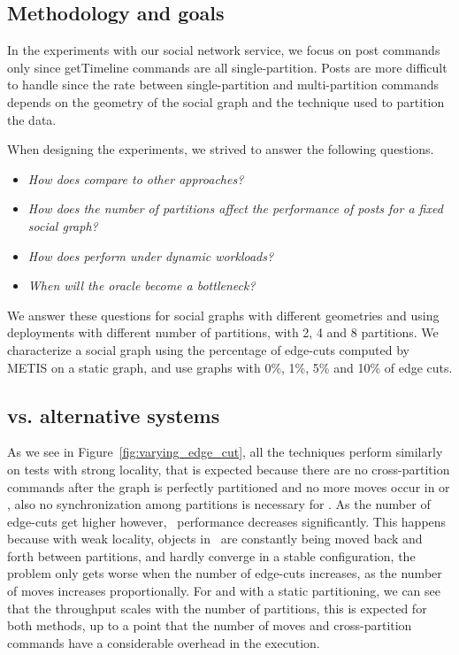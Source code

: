 \subsection{Methodology and goals}
\label{sec:evaluation:methodology}

In the experiments with our social network service, we focus on post
commands only since getTimeline commands are all single-partition.
Posts are more difficult to handle since the rate between
single-partition and multi-partition commands depends on the geometry
of the social graph and the technique used to partition the data.

When designing the experiments, we strived to answer the following questions.
\begin{itemize}
\item \emph{How does \dynastar compare to other approaches?} 
\item \emph{How does the number of partitions affect the performance of posts for a fixed social graph?}
\item \emph{How does \dynastar perform under dynamic workloads?}
\item \emph{When will the oracle become a bottleneck?}
\end{itemize}

We answer these questions for social graphs with different geometries
and using deployments with different number of partitions, with 2, 4
and 8 partitions.  We characterize a social graph using the percentage
of edge-cuts computed by METIS on a static graph, and use graphs with
0\%, 1\%, 5\% and 10\% of edge cuts.


\subsection{\dynastar vs. alternative systems}
\label{sec:evaluation:results}

As we see in Figure~\ref{fig:varying_edge_cut}, all the techniques
perform similarly on tests with strong locality, that is expected
because there are no cross-partition commands after the graph is
perfectly partitioned and no more moves occur in \dynastar or \dssmr,
also no synchronization among partitions is necessary for \ssmr.  As
the number of edge-cuts get higher however, \dssmr\ performance
decreases significantly.  This happens because with weak locality,
objects in \dssmr\ are constantly being moved back and forth between
partitions, and hardly converge in a stable configuration, the problem
only gets worse when the number of edge-cuts increases, as the number
of moves increases proportionally.  For \dynastar and \ssmr with a
static partitioning, we can see that the throughput scales with the
number of partitions, this is expected for both methods, up to a point
that the number of moves and cross-partition commands have a
considerable overhead in the execution.

